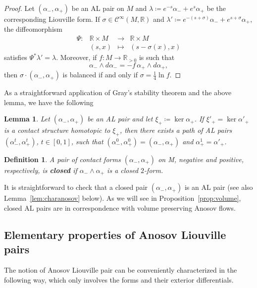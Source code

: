 \documentclass[letterpaper, 11pt]{article}
\numberwithin{equation}{section}
\newtheorem{lem}[thm]{Lemma}
\newtheorem{defn}[thm]{Definition}
\newcommand{\R}{\mathbb{R}}
\begin{document}
\begin{proof} Let $(\alpha_-, \alpha_+)$ be an AL pair on $M$ and $\lambda \coloneqq  e^{-s} \alpha_- + e^s \alpha_+$ be the corresponding Liouville form. If $\sigma \in \mathcal{C}^\infty(M, \R)$ and $\lambda' \coloneqq e^{-(s+\sigma)} \alpha_- + e^{s+ \sigma} \alpha_+$, the diffeomorphism 
$$\begin{array}{rccc}
\Psi :  & \R \times M & \longrightarrow & \R \times M \\
	 & (s,x) & \longmapsto & (s - \sigma(x), x)
\end{array}$$
satisfies $\Psi^* \lambda' = \lambda$. Moreover, if $f: M \rightarrow \R_{>0}$ is such that $$ \alpha_- \wedge d\alpha_- = -f\, \alpha_+ \wedge d\alpha_+,$$ then $\sigma \cdot ( \alpha_-,  \alpha_+)$ is balanced if and only if $\sigma = \frac{1}{4} \ln f$.
\end{proof}

As a straightforward application of Gray's stability theorem and the above lemma, we have the following

\begin{lem} Let $(\alpha_-, \alpha_+)$ be an AL pair and let $\xi_+ \coloneqq \ker \alpha_+$. If $\xi'_+ = \ker \alpha'_+$ is a contact structure homotopic to $\xi_+$, then there exists a path of AL pairs $(\alpha^t_-, \alpha^t_+)$, $t \in [0,1]$, such that $(\alpha^0_-, \alpha^0_+) = (\alpha_-, \alpha_+)$ and $\alpha^1_+ = \alpha'_+$.
\end{lem}

\begin{defn} \label{def:closed} A pair of contact forms $(\alpha_-, \alpha_+)$ on M, negative and positive, respectively, is \textbf{closed} if $\alpha_- \wedge \alpha_+$ is a closed $2$-form.
\end{defn}

It is straightforward to check that a closed pair $(\alpha_-, \alpha_+)$ is an AL pair (see also Lemma~\ref{lem:charanosov} below). As we will see in Proposition~\ref{prop:volume}, closed AL pairs are in correspondence with volume preserving Anosov flows.

		\subsection{Elementary properties of Anosov Liouville pairs} \label{section:elem}
		
The notion of Anosov Liouville pair can be conveniently characterized in the following way, which only involves the forms and their exterior differentials.
\end{document}
